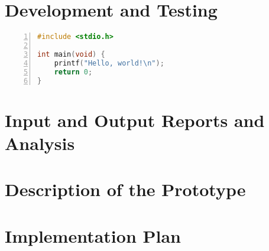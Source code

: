 \section{Development and Testing}

\begin{lstlisting}[numbers=left, language=C]
#include <stdio.h>

int main(void) {
    printf("Hello, world!\n");
    return 0;
}
\end{lstlisting}

\section{Input and Output Reports and Analysis}

\section{Description of the Prototype}

\section{Implementation Plan}
